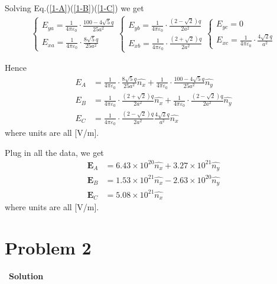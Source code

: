 \documentclass[12pt,a4paper]{article}
\begin{document}
Solving Eq.(\ref{1-A})(\ref{1-B})(\ref{1-C}) we get
\begin{align*}
    \left\{
        \begin{array}{l}
             E_{ya} =  \frac{1}{4\pi\varepsilon_0} \cdot \frac{100-4\sqrt{5}q}{25a^2}\\
             E_{xa} = \frac{1}{4\pi\varepsilon_0} \cdot \frac{8\sqrt{5}q}{25a^2}
        \end{array}
    \right.
    \left\{
        \begin{array}{l}
             E_{yb} = \frac{1}{4\pi\varepsilon_0} \cdot \frac{(2-\sqrt{2})q}{2a^2} \\
             E_{xb} = \frac{1}{4\pi\varepsilon_0} \cdot \frac{(2+\sqrt{2})q}{2a^2}
        \end{array}
    \right.
    \left\{
        \begin{array}{l}
             E_{yc} =  0\\
             E_{xc} = \frac{1}{4\pi\varepsilon_0} \cdot \frac{4\sqrt{2}q}{a^2}
        \end{array}
    \right.
\end{align*}

Hence
\begin{align}
    E_A &= \frac{1}{4\pi\varepsilon_0} \cdot \frac{8\sqrt{5}q}{25a^2} \hat{n_x} + \frac{1}{4\pi\varepsilon_0} \cdot \frac{100-4\sqrt{5}q}{25a^2} \hat{n_y} \\
    E_B &= \frac{1}{4\pi\varepsilon_0} \cdot \frac{(2+\sqrt{2})q}{2a^2} \hat{n_x} +  \frac{1}{4\pi\varepsilon_0} \cdot \frac{(2-\sqrt{2})q}{2a^2} \hat{n_y} \\
    E_C &=  \frac{1}{4\pi\varepsilon_0} \cdot \frac{(2-\sqrt{2})q}{2a^2} \frac{4\sqrt{2}q}{a^2} \hat{n_x}
\end{align}
where units are all [V/m].

Plug in all the data, we get
\begin{align}
    \textbf{E}_A &= 6.43 \times 10^{20} \hat{n_x} + 3.27 \times 10^{21} \hat{n_y} \\
    \textbf{E}_B &= 1.53 \times 10^{21} \hat{n_x} - 2.63 \times 10^{20} \hat{n_y} \\
    \textbf{E}_C &= 5.08 \times 10^{21} \hat{n_x}
\end{align}
where units are all [V/m].

\section*{\large \textbf{Problem 2}}~{\textbf{Solution}}
\end{document}
